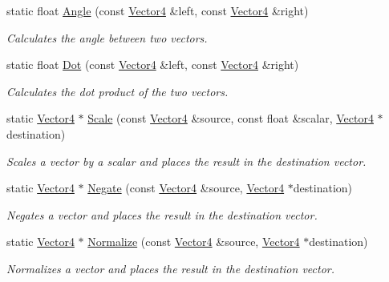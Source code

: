 \begin{DoxyCompactItemize}
static float \hyperlink{class_flounder_1_1_vector4_a1ffdf0e81c8f9a6bf6ebe36b3e5460b5}{Angle} (const \hyperlink{class_flounder_1_1_vector4}{Vector4} \&left, const \hyperlink{class_flounder_1_1_vector4}{Vector4} \&right)
\begin{DoxyCompactList}\small\item\em Calculates the angle between two vectors. \end{DoxyCompactList}\item 
static float \hyperlink{class_flounder_1_1_vector4_a7ddb1446d6d62c6c2b60d8e3e9a936ee}{Dot} (const \hyperlink{class_flounder_1_1_vector4}{Vector4} \&left, const \hyperlink{class_flounder_1_1_vector4}{Vector4} \&right)
\begin{DoxyCompactList}\small\item\em Calculates the dot product of the two vectors. \end{DoxyCompactList}\item 
static \hyperlink{class_flounder_1_1_vector4}{Vector4} $\ast$ \hyperlink{class_flounder_1_1_vector4_a632d81434743d232e0339ca80ae69222}{Scale} (const \hyperlink{class_flounder_1_1_vector4}{Vector4} \&source, const float \&scalar, \hyperlink{class_flounder_1_1_vector4}{Vector4} $\ast$destination)
\begin{DoxyCompactList}\small\item\em Scales a vector by a scalar and places the result in the destination vector. \end{DoxyCompactList}\item 
static \hyperlink{class_flounder_1_1_vector4}{Vector4} $\ast$ \hyperlink{class_flounder_1_1_vector4_a1889b7225e00cda0e8fa022d0ad2f1b1}{Negate} (const \hyperlink{class_flounder_1_1_vector4}{Vector4} \&source, \hyperlink{class_flounder_1_1_vector4}{Vector4} $\ast$destination)
\begin{DoxyCompactList}\small\item\em Negates a vector and places the result in the destination vector. \end{DoxyCompactList}\item 
static \hyperlink{class_flounder_1_1_vector4}{Vector4} $\ast$ \hyperlink{class_flounder_1_1_vector4_a5236dfda2985ef593f81269a43e904f2}{Normalize} (const \hyperlink{class_flounder_1_1_vector4}{Vector4} \&source, \hyperlink{class_flounder_1_1_vector4}{Vector4} $\ast$destination)
\begin{DoxyCompactList}\small\item\em Normalizes a vector and places the result in the destination vector. \end{DoxyCompactList}\item 

\end{DoxyCompactItemize}
